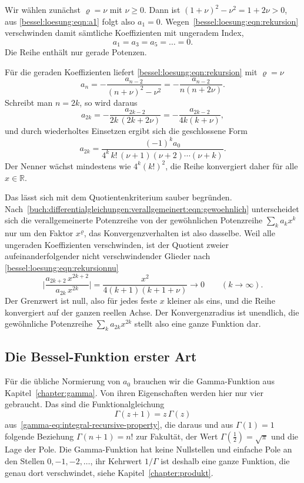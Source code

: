 Wir wählen zunächst $\varrho=\nu$ mit $\nu\ge 0$.
Dann ist $(1+\nu)^2-\nu^2 = 1+2\nu > 0$, aus \eqref{bessel:loesung:eqn:a1} folgt also $a_1=0$.
Wegen~\eqref{bessel:loesung:eqn:rekursion} verschwinden damit sämtliche Koeffizienten mit ungeradem Index,
\begin{equation}
a_1 = a_3 = a_5 = \dots = 0.
\label{bessel:loesung:eqn:ungerade}
\end{equation}
Die Reihe enthält nur gerade Potenzen.

Für die geraden Koeffizienten liefert \eqref{bessel:loesung:eqn:rekursion} mit $\varrho=\nu$
\begin{equation}
a_n
=
-\frac{a_{n-2}}{(n+\nu)^2-\nu^2}
=
-\frac{a_{n-2}}{n(n+2\nu)}.
\label{bessel:loesung:eqn:rekursionnu}
\end{equation}
Schreibt man $n=2k$, so wird daraus
\[
a_{2k}
=
-\frac{a_{2k-2}}{2k\,(2k+2\nu)}
=
-\frac{a_{2k-2}}{4k(k+\nu)},
\]
und durch wiederholtes Einsetzen ergibt sich die geschlossene Form
\begin{equation}
a_{2k}
=
\frac{(-1)^k a_0}{4^k\, k!\,(\nu+1)(\nu+2)\cdots(\nu+k)}.
\label{bessel:loesung:eqn:a2k}
\end{equation}
Der Nenner wächst mindestens wie $4^k(k!)^2$, die Reihe konvergiert daher für alle $x\in\mathbb{R}$.

Das lässt sich mit dem Quotientenkriterium sauber begründen.
Nach~\eqref{buch:differentialgleichungen:verallgemeinert:eqn:gewoehnlich} unterscheidet sich die verallgemeinerte Potenzreihe von der
gewöhnlichen Potenzreihe $\sum_k a_kx^k$ nur um den Faktor $x^{\varrho}$, das Konvergenzverhalten ist also dasselbe.
Weil alle ungeraden Koeffizienten verschwinden, ist der Quotient zweier aufeinanderfolgender nicht verschwindender Glieder nach
\eqref{bessel:loesung:eqn:rekursionnu}
\[
\biggl|
\frac{a_{2k+2}\,x^{2k+2}}{a_{2k}\,x^{2k}}
\biggr|
=
\frac{x^2}{4(k+1)(k+1+\nu)}
\longrightarrow
0
\qquad (k\to\infty).
\]
Der Grenzwert ist null, also für jedes feste $x$ kleiner als eins, und die Reihe konvergiert auf der ganzen reellen Achse.
Der Konvergenzradius ist unendlich, die gewöhnliche Potenzreihe $\sum_k a_{2k}x^{2k}$ stellt also eine ganze Funktion dar.

%
%
\subsection{Die Bessel-Funktion erster Art
\label{bessel:loesung:subsection:jnu}}
Für die übliche Normierung von $a_0$ brauchen wir die Gamma-Funktion aus Kapitel~\ref{chapter:gamma}.
%
Von ihren Eigenschaften werden hier nur vier gebraucht.
Das sind die Funktionalgleichung
\begin{equation}
\Gamma(z+1)
=
z\,\Gamma(z)
\label{bessel:loesung:eqn:gammafunktional}
\end{equation}
aus~\eqref{gamma-eq:integral-recursive-property}, die daraus und aus $\Gamma(1)=1$ folgende Beziehung $\Gamma(n+1)=n!$ zur Fakultät, der Wert $\Gamma(\frac12)=\sqrt{\pi}$ und die Lage der Pole.
Die Gamma-Funktion hat keine Nullstellen und einfache Pole an den Stellen $0,-1,-2,\dots$, ihr Kehrwert $1/\Gamma$ ist deshalb eine ganze Funktion, die genau dort verschwindet, siehe Kapitel~\ref{chapter:produkt}.

